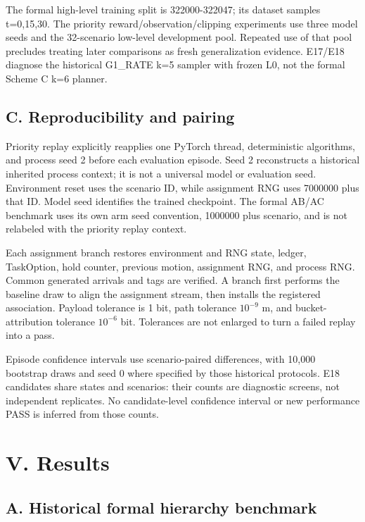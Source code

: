 The formal high-level training split is 322000-322047; its dataset samples t=0,15,30. The priority reward/observation/clipping experiments use three model seeds and the 32-scenario low-level development pool. Repeated use of that pool precludes treating later comparisons as fresh generalization evidence. E17/E18 diagnose the historical G1\_RATE k=5 sampler with frozen L0, not the formal Scheme C k=6 planner.

\subsection*{C. Reproducibility and pairing}

Priority replay explicitly reapplies one PyTorch thread, deterministic algorithms, and process seed 2 before each evaluation episode. Seed 2 reconstructs a historical inherited process context; it is not a universal model or evaluation seed. Environment reset uses the scenario ID, while assignment RNG uses 7000000 plus that ID. Model seed identifies the trained checkpoint. The formal AB/AC benchmark uses its own arm seed convention, 1000000 plus scenario, and is not relabeled with the priority replay context.

Each assignment branch restores environment and RNG state, ledger, TaskOption, hold counter, previous motion, assignment RNG, and process RNG. Common generated arrivals and tags are verified. A branch first performs the baseline draw to align the assignment stream, then installs the registered association. Payload tolerance is 1 bit, path tolerance $10^{-9}$ m, and bucket-attribution tolerance $10^{-6}$ bit. Tolerances are not enlarged to turn a failed replay into a pass.

Episode confidence intervals use scenario-paired differences, with 10,000 bootstrap draws and seed 0 where specified by those historical protocols. E18 candidates share states and scenarios: their counts are diagnostic screens, not independent replicates. No candidate-level confidence interval or new performance PASS is inferred from those counts.

\section*{V. Results}

\subsection*{A. Historical formal hierarchy benchmark}

